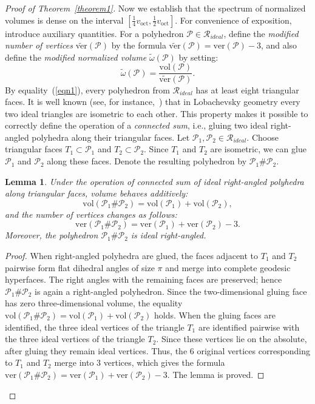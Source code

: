 \documentclass{amsart}
\newtheorem{lemma}{Lemma}[section]
\newcommand{\vol}{\mathrm{vol}}
\newcommand{\tomega}{\widetilde{\omega}}
\newcommand{\tN}{\widetilde{\ver}}
\newcommand{\voct}{v_{\mathrm{oct}}}
\newcommand{\ver}{\mathrm{ver}}
\begin{document}
\begin{proof}[Proof of Theorem~\ref{theorem1}]
	Now we establish that the spectrum of normalized volumes is dense on the interval $\left[ \frac{1}{4} \voct, \frac{1}{2} \voct \right]$.
	For convenience of exposition, introduce auxiliary quantities. For a polyhedron $\mathcal P \in \mathcal R_{ideal}$, define the \textit{modified number of vertices} $\tN(\mathcal P)$ by the formula  
	$\tN(\mathcal P) = \ver(\mathcal P) - 3$, and also define the \emph{modified normalized volume} $\tomega(\mathcal P)$ by setting:
	$$
	\tomega(\mathcal P) = \frac{\vol(\mathcal P)}{\tN(\mathcal P)}.
	$$		
	By equality~(\ref{eqn1}), every polyhedron from $\mathcal{R}_{ideal}$ has at least eight triangular faces.
	It is well known (see, for instance,~\cite[Prop. 2.5]{FG2011}) that in Lobachevsky geometry every two ideal triangles are isometric to each other.
		This property makes it possible to correctly define the operation of a \textit{connected sum}, i.e., gluing two ideal right-angled polyhedra along their triangular faces.
	Let $\mathcal P_1, \mathcal P_2 \in \mathcal{R}_{ideal}$. Choose triangular faces $T_1 \subset \mathcal P_1$ and $T_2 \subset \mathcal P_2$.
	Since $T_1$ and $T_2$ are isometric, we can glue $\mathcal P_1$ and $\mathcal P_2$ along these faces.
	Denote the resulting polyhedron by $\mathcal P_1 \# \mathcal P_2$. 
	
	\begin{lemma} \label{lemma4.1}
		Under the operation of connected sum of ideal right-angled polyhedra along triangular faces, volume behaves additively: 
		$$
		\vol(\mathcal P_1 \# \mathcal P_2) = \vol(\mathcal P_1) + \vol(\mathcal P_2),
		$$
		and the number of vertices changes as follows:
		$$
		\ver(\mathcal P_1 \# \mathcal P_2) = \ver(\mathcal P_1) + \ver(\mathcal P_2) - 3.
		$$
		Moreover, the polyhedron $\mathcal P_1 \# \mathcal P_2$ is ideal right-angled.
	\end{lemma}
	\begin{proof}
			When right-angled polyhedra are glued, the faces adjacent to $T_1$ and $T_2$ pairwise form flat dihedral angles of size $\pi$ and merge into complete geodesic hyperfaces. The right angles with the remaining faces are preserved; hence $\mathcal P_1 \# \mathcal P_2$ is again a right-angled polyhedron.
			Since the two-dimensional gluing face has zero three-dimensional volume, the equality $\vol(\mathcal P_1 \# \mathcal P_2) = \vol(\mathcal P_1) + \vol(\mathcal P_2)$ holds. When the gluing faces are identified, the three ideal vertices of the triangle $T_1$ are identified pairwise with the three ideal vertices of the triangle $T_2$. Since these vertices lie on the absolute, after gluing they remain ideal vertices. Thus, the $6$ original vertices corresponding to $T_1$ and $T_2$ merge into $3$ vertices, which gives the formula $\ver(\mathcal P_1 \# \mathcal P_2) = \ver(\mathcal P_1) + \ver(\mathcal P_2) - 3$. The lemma is proved.
	\end{proof}
	

\end{proof}
\end{document}
